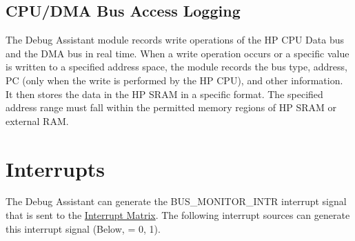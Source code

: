 \documentclass[main\_\_EN.tex]{subfiles}
\begin{document}
\subsection{CPU/DMA Bus Access Logging}

The Debug Assistant module records write operations of the HP CPU Data bus and the DMA bus in real time. When a write operation occurs or a specific value is written to a specified address space, the module records the bus type, address, PC (only when the write is performed by the HP CPU), and other information. It then stores the data in the HP SRAM in a specific format. The specified address range must fall within the permitted memory regions of HP SRAM or external RAM.


\section{Interrupts}
\label{sec:dbgassist-interrupts}

The Debug Assistant can generate the BUS\_MONITOR\_INTR interrupt signal that is sent to the \hyperref[mod:intmtrx]{Interrupt Matrix}. The following interrupt sources can generate this interrupt signal (Below,  = 0, 1).
\end{document}
